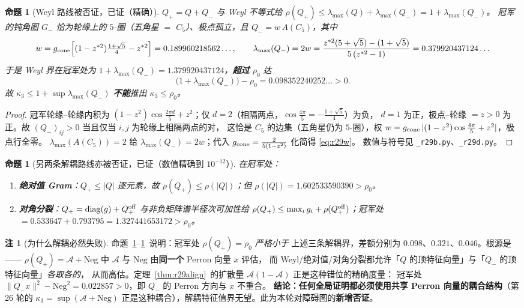 \documentclass[UTF8,11pt]{ctexart}
\newtheorem{proposition}[theorem]{命题}
\theoremstyle{definition}
\newtheorem{remark}[theorem]{注}
\begin{document}
\begin{proposition}[Weyl 路线被否证，已证（精确）]\label{prop:r29weyl}
$Q_+=Q+Q_-$ 与 Weyl 不等式给 $\rho(Q_+)\le\lambda_{\max}(Q)+\lambda_{\max}(Q_-)=1+\lambda_{\max}(Q_-)$。
冠军的钝角图 $G_-$ 恰为轮缘上的 $5$-圈（五角星 $=$ $C_5$）、极点孤立，且 $Q_-=w\,A(C_5)$，其中
\begin{equation}\label{eq:r29w}
w=g_{\rm cone}\Bigl[(1-z^{*2})\tfrac{1+\sqrt5}4-z^{*2}\Bigr]=0.189960218562\ldots,\qquad
\lambda_{\max}(Q_-)=2w=\frac{z^{*2}(5+\sqrt5)-(1+\sqrt5)}{5\,(z^{*2}-1)}=0.379920437124\ldots
\end{equation}
于是 Weyl 界在冠军处为 $1+\lambda_{\max}(Q_-)=1.379920437124$，\textbf{超过} $\rho_0$ 达
\begin{equation}\label{eq:r29over}
\bigl(1+\lambda_{\max}(Q_-)\bigr)-\rho_0=0.098352240252\ldots>0 .
\end{equation}
故 $\kappa_3\le1+\sup\lambda_{\max}(Q_-)$ \textbf{不能}推出 $\kappa_3\le\rho_0$。
\end{proposition}
\begin{proof}
冠军轮缘--轮缘内积为 $(1-z^2)\cos\frac{2\pi d}5+z^2$；仅 $d=2$（相隔两点，$\cos\frac{4\pi}5=-\frac{1+\sqrt5}4$）为负，
$d=1$ 为正，极点--轮缘 $=z>0$ 为正。故 $(Q_-)_{ij}>0$ 当且仅当 $i,j$ 为轮缘上相隔两点的对，
这恰是 $C_5$ 的边集（五角星仍为 $5$-圈），权 $w=g_{\rm cone}\,|(1-z^2)\cos\frac{4\pi}5+z^2|$，极点行全零。
$\lambda_{\max}(A(C_5))=2$ 给 $\lambda_{\max}(Q_-)=2w$；代入 $g_{\rm cone}=\frac2{5(1-z^2)}$ 化简得 \eqref{eq:r29w}。
数值与符号见 \texttt{\_r29b.py}、\texttt{\_r29d.py}。
\end{proof}

\begin{proposition}[另两条解耦路线亦被否证，已证（数值精确到 $10^{-12}$）]\label{prop:r29other}
在冠军处：
\begin{enumerate}[label=(\alph*),itemsep=1pt]
\item \textbf{绝对值 Gram}：$Q_+\le|Q|$ 逐元素，故 $\rho(Q_+)\le\rho(|Q|)$；但 $\rho(|Q|)=1.602533590390>\rho_0$。
\item \textbf{对角分裂}：$Q_+=\operatorname{diag}(g)+Q_+^{\rm off}$ 与非负矩阵谱半径次可加性给
$\rho(Q_+)\le\max_i g_i+\rho(Q_+^{\rm off})$；冠军处 $=0.533647+0.793795=1.327441653172>\rho_0$。
\end{enumerate}
\end{proposition}
\begin{remark}[为什么解耦必然失败]\label{rem:r29whydec}
命题~\ref{prop:r29weyl}--\ref{prop:r29other}~说明：冠军处 $\rho(Q_+)=\rho_0$ \emph{严格小于}
上述三条解耦界，差额分别为 $0.098$、$0.321$、$0.046$。根源是——
$\rho(Q_+)=\mathcal A+\mathrm{Neg}$ 中 $\mathcal A$ 与 $\mathrm{Neg}$ 由\textbf{同一个} Perron 向量 $x$ 评估，
而 Weyl/绝对值/对角分裂都允许「$Q$ 的顶特征向量」与「$Q_-$ 的顶特征向量」\emph{各取各的}，
从而高估。定理~\ref{thm:r29align}~的扩散量 $\mathcal A(1-\mathcal A)$ 正是这种错位的精确度量：
冠军处 $\|Q_-x\|^2-\mathrm{Neg}^2=0.022857>0$，即 $Q_-$ 的 Perron 方向与 $x$ 不重合。
\textbf{结论：任何全局证明都必须使用共享 Perron 向量的耦合结构}（第 26 轮的 $\kappa_3=\sup(\mathcal A+\mathrm{Neg})$
正是这种耦合），解耦特征值界无望。此为本轮对障碍图的\textbf{新增否证}。
\end{remark}
\end{document}

